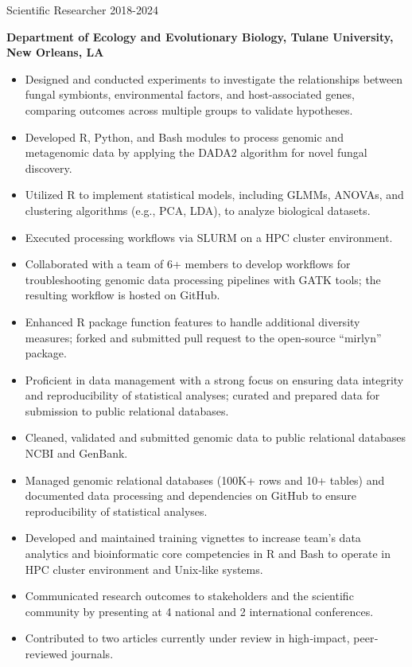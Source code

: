 \documentclass[
  letterpaper,
  DIV=11,
  numbers=noendperiod]{scrartcl}
\providecommand{\tightlist}{%
  \setlength{\itemsep}{0pt}\setlength{\parskip}{0pt}}\usepackage{longtable,booktabs,array}
\begin{document}
{Scientific Researcher} {2018-2024}

\textbf{Department of Ecology and Evolutionary Biology, Tulane
University, New Orleans, LA}

\begin{itemize}
\tightlist
\item
  Designed and conducted experiments to investigate the relationships
  between fungal symbionts, environmental factors, and host-associated
  genes, comparing outcomes across multiple groups to validate
  hypotheses.
\item
  Developed R, Python, and Bash modules to process genomic and
  metagenomic data by applying the DADA2 algorithm for novel fungal
  discovery.
\item
  Utilized R to implement statistical models, including GLMMs, ANOVAs,
  and clustering algorithms (e.g., PCA, LDA), to analyze biological
  datasets.
\item
  Executed processing workflows via SLURM on a HPC cluster environment.
\item
  Collaborated with a team of 6+ members to develop workflows for
  troubleshooting genomic data processing pipelines with GATK tools; the
  resulting workflow is hosted on GitHub.
\item
  Enhanced R package function features to handle additional diversity
  measures; forked and submitted pull request to the open-source
  ``mirlyn'' package.
\item
  Proficient in data management with a strong focus on ensuring data
  integrity and reproducibility of statistical analyses; curated and
  prepared data for submission to public relational databases.
\item
  Cleaned, validated and submitted genomic data to public relational
  databases NCBI and GenBank.
\item
  Managed genomic relational databases (100K+ rows and 10+ tables) and
  documented data processing and dependencies on GitHub to ensure
  reproducibility of statistical analyses.
\item
  Developed and maintained training vignettes to increase team's data
  analytics and bioinformatic core competencies in R and Bash to operate
  in HPC cluster environment and Unix‐like systems.
\item
  Communicated research outcomes to stakeholders and the scientific
  community by presenting at 4 national and 2 international conferences.
\item
  Contributed to two articles currently under review in high‐impact,
  peer‐reviewed journals.
\end{itemize}
\end{document}
